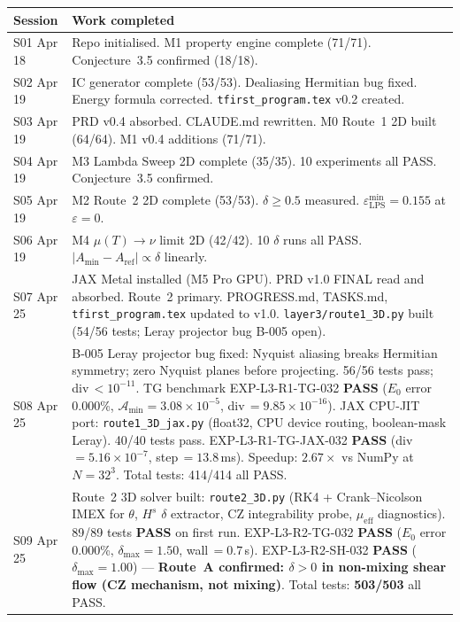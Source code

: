 \documentclass[11pt, a4paper]{article}
\theoremstyle{definition}
\theoremstyle{remark}
\newcommand{\Afield}{\mathcal{A}}
\newcommand{\eps}{\varepsilon}
\newcommand{\PASS}{\textcolor{passgreen}{\textbf{PASS}}}
\newcommand{\thet}{\theta}
\newcommand{\epslps}{\eps_{\mathrm{LPS}}}
\newcommand{\delt}{\delta}
\begin{document}
\begin{center}
\begin{tabular}{lp{9cm}}
\toprule
\textbf{Session} & \textbf{Work completed} \\
\midrule
S01 Apr 18 &
  Repo initialised. M1 property engine complete (71/71). Conjecture~3.5 confirmed (18/18). \\
S02 Apr 19 &
  IC generator complete (53/53). Dealiasing Hermitian bug fixed. Energy formula corrected.
  \texttt{tfirst\_program.tex} v0.2 created. \\
S03 Apr 19 &
  PRD v0.4 absorbed. CLAUDE.md rewritten. M0 Route~1 2D built (64/64). M1 v0.4 additions (71/71). \\
S04 Apr 19 &
  M3 Lambda Sweep 2D complete (35/35). 10 experiments all PASS. Conjecture~3.5 confirmed. \\
S05 Apr 19 &
  M2 Route~2 2D complete (53/53). $\delt\geq 0.5$ measured. $\epslps^{\min}=0.155$ at $\eps=0$. \\
S06 Apr 19 &
  M4 $\mu(T)\to\nu$ limit 2D (42/42). 10 $\delta$ runs all PASS. $|A_{\min}-A_{\mathrm{ref}}|\propto\delta$ linearly. \\
S07 Apr 25 &
  JAX Metal installed (M5 Pro GPU). PRD v1.0 FINAL read and absorbed. Route~2 primary.
  PROGRESS.md, TASKS.md, \texttt{tfirst\_program.tex} updated to v1.0.
  \texttt{layer3/route1\_3D.py} built (54/56 tests; Leray projector bug B-005 open). \\
S08 Apr 25 &
  B-005 Leray projector bug fixed: Nyquist aliasing breaks Hermitian symmetry;
  zero Nyquist planes before projecting. 56/56 tests pass; div\,$< 10^{-11}$.
  TG benchmark EXP-L3-R1-TG-032 \PASS{} ($E_0$ error 0.000\%, $\Afield_{\min}=3.08\times10^{-5}$,
  div\,$=9.85\times10^{-16}$).
  JAX CPU-JIT port: \texttt{route1\_3D\_jax.py} (float32, CPU device routing,
  boolean-mask Leray). 40/40 tests pass.
  EXP-L3-R1-TG-JAX-032 \PASS{} (div\,$=5.16\times10^{-7}$, step\,$=13.8$\,ms).
  Speedup: $\mathbf{2.67\times}$ vs NumPy at $N=32^3$.
  Total tests: 414/414 all PASS. \\
S09 Apr 25 &
  Route~2 3D solver built: \texttt{route2\_3D.py} (RK4 + Crank--Nicolson IMEX for $\thet$,
  $H^s$ $\delt$ extractor, CZ integrability probe, $\mu_{\mathrm{eff}}$ diagnostics).
  89/89 tests \PASS{} on first run.
  EXP-L3-R2-TG-032 \PASS{} ($E_0$ error 0.000\%, $\delt_{\max}=1.50$, wall\,$=0.7$\,s).
  EXP-L3-R2-SH-032 \PASS{} ($\delt_{\max}=1.00$) ---
  \textbf{Route~A confirmed: $\delt > 0$ in non-mixing shear flow (CZ mechanism, not mixing)}.
  Total tests: \textbf{503/503} all PASS. \\

\end{tabular}
\end{center}
\end{document}
